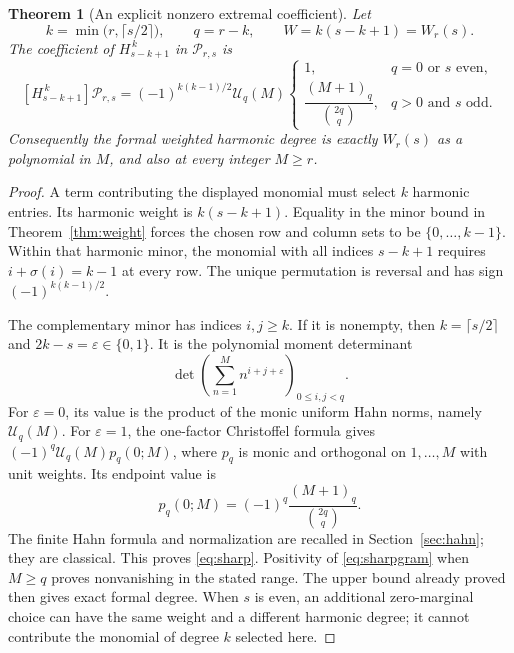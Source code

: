 \documentclass[11pt,letterpaper]{article}
\numberwithin{equation}{section}
\newtheorem{theorem}{Theorem}[section]
\theoremstyle{definition}\newtheorem{definition}[theorem]{Definition}
\theoremstyle{remark}\newtheorem{remark}[theorem]{Remark}
\begin{document}
\begin{theorem}[An explicit nonzero extremal coefficient]\label{thm:sharp}
Let
\[
 k=\min\bigl(r,\lceil s/2\rceil\bigr),\qquad q=r-k,
 \qquad W=k(s-k+1)=W_r(s).
\]
The coefficient of $H_{s-k+1}^{\,k}$ in $\mathcal P_{r,s}$ is
\begin{equation}\label{eq:sharp}
 \boxed{\displaystyle
 [H_{s-k+1}^{\,k}]\mathcal P_{r,s}=
 (-1)^{k(k-1)/2}\mathcal U_q(M)
 \begin{cases}
  1,&q=0\text{ or }s\text{ even},\\[2pt]
  \dfrac{(M+1)_q}{\binom{2q}{q}},&q>0\text{ and }s\text{ odd}.
 \end{cases}}
\end{equation}
Consequently the formal weighted harmonic degree is exactly $W_r(s)$
as a polynomial in $M$, and also at every integer $M\ge r$.
\end{theorem}
\begin{proof}
A term contributing the displayed monomial must select $k$ harmonic
entries. Its harmonic weight is $k(s-k+1)$. Equality in the minor bound
in Theorem~\ref{thm:weight} forces the chosen row and column sets to be
$\{0,\ldots,k-1\}$. Within that harmonic minor, the monomial with all
indices $s-k+1$ requires $i+\sigma(i)=k-1$ at every row. The unique
permutation is reversal and has sign $(-1)^{k(k-1)/2}$.

The complementary minor has indices $i,j\ge k$. If it is nonempty,
then $k=\lceil s/2\rceil$ and $2k-s=\varepsilon\in\{0,1\}$.
It is the polynomial moment determinant
\begin{equation}\label{eq:sharpgram}
       \det\left(\sum_{n=1}^M n^{i+j+\varepsilon}\right)_{0\le i,j<q}.
\end{equation}
For $\varepsilon=0$, its value is the product of the monic uniform
Hahn norms, namely $\mathcal U_q(M)$.
For $\varepsilon=1$, the one-factor Christoffel formula gives
$(-1)^q\mathcal U_q(M)p_q(0;M)$, where $p_q$ is monic and orthogonal
on $1,\ldots,M$ with unit weights. Its endpoint value is
\[
       p_q(0;M)=(-1)^q\frac{(M+1)_q}{\binom{2q}{q}}.
\]
The finite Hahn formula and normalization are recalled in
Section~\ref{sec:hahn}; they are classical. This proves
\eqref{eq:sharp}. Positivity of \eqref{eq:sharpgram} when $M\ge q$
proves nonvanishing in the stated range. The upper bound already proved
then gives exact formal degree. When $s$ is even, an additional
zero-marginal choice can have the same weight and a different harmonic
degree; it cannot contribute the monomial of degree $k$ selected here.
\end{proof}
\end{document}

